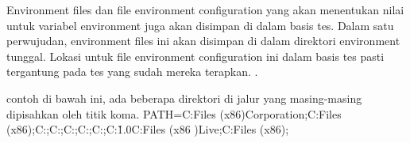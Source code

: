Environment files dan file environment configuration yang akan menentukan nilai untuk variabel environment juga akan disimpan di dalam basis tes. Dalam satu perwujudan, environment files ini akan disimpan di dalam direktori environment tunggal. Lokasi untuk file environment configuration ini dalam basis tes pasti tergantung pada tes yang sudah mereka terapkan. \cite{kilgore1997directly}.

contoh di bawah ini, ada beberapa direktori di jalur yang masing-masing dipisahkan oleh titik koma.
PATH=C:\Program Files (x86)\NVIDIA Corporation\PhysX\Common;C:\Program Files (x86)\WinSCP;C:\Perl\site\bin;C:\Perl\bin;C:\WINDOWS{};C:\WINDOWS;C:\WINDOWS {}\Wbem;C:\WINDOWS{}\WindowsPowerShell\v1.0\;C:\Program Files (x86 )\Windows Live\Shared;C:\Program Files (x86)\FAHClient; 



